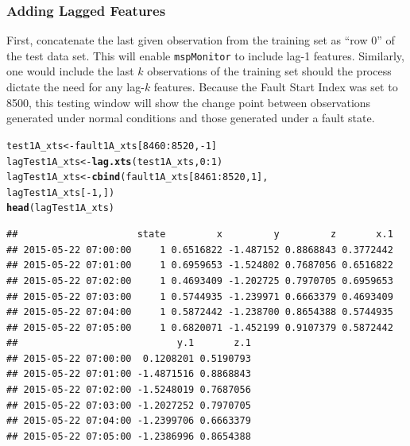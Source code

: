 \documentclass{report}\usepackage[]{graphicx}\usepackage[]{color}
\makeatletter
\newcommand{\hlnum}[1]{\textcolor[rgb]{0.686,0.059,0.569}{#1}}%
\newcommand{\hlopt}[1]{\textcolor[rgb]{0,0,0}{#1}}%
\newcommand{\hlstd}[1]{\textcolor[rgb]{0.345,0.345,0.345}{#1}}%
\newcommand{\hlkwb}[1]{\textcolor[rgb]{0.69,0.353,0.396}{#1}}%
\newcommand{\hlkwd}[1]{\textcolor[rgb]{0.737,0.353,0.396}{\textbf{#1}}}%
\newenvironment{kframe}{%
 \def\at@end@of@kframe{}%
 \ifinner\ifhmode%
  \def\at@end@of@kframe{\end{minipage}}%
  \begin{minipage}{\columnwidth}%
 \fi\fi%
 \def\FrameCommand##1{\hskip\@totalleftmargin \hskip-\fboxsep
 \colorbox{shadecolor}{##1}\hskip-\fboxsep
     \hskip-\linewidth \hskip-\@totalleftmargin \hskip\columnwidth}%
 \MakeFramed {\advance\hsize-\width
   \@totalleftmargin\z@ \linewidth\hsize
   \@setminipage}}%
 {\par\unskip\endMakeFramed%
 \at@end@of@kframe}
\newenvironment{knitrout}{}{} %
\makeatother
\begin{document}
\subsubsection{Adding Lagged Features}
First, concatenate the last given observation from the training set as ``row 0'' of the test data set. This will enable \texttt{mspMonitor} to include lag-1 features. Similarly, one would include the last $k$ observations of the training set should the process dictate the need for any lag-$k$ features. Because the Fault Start Index was set to 8500, this testing window will show the change point between observations generated under normal conditions and those generated under a fault state.
\begin{knitrout}
\color{fgcolor}\begin{kframe}
\begin{alltt}
\hlstd{test1A_xts} \hlkwb{<-} \hlstd{fault1A_xts[}\hlnum{8460}\hlopt{:}\hlnum{8520}\hlstd{,} \hlopt{-}\hlnum{1}\hlstd{]}
\hlstd{lagTest1A_xts} \hlkwb{<-} \hlkwd{lag.xts}\hlstd{(test1A_xts,} \hlnum{0}\hlopt{:}\hlnum{1}\hlstd{)}
\hlstd{lagTest1A_xts} \hlkwb{<-} \hlkwd{cbind}\hlstd{(fault1A_xts[}\hlnum{8461}\hlopt{:}\hlnum{8520}\hlstd{,}\hlnum{1}\hlstd{],}
                       \hlstd{lagTest1A_xts[}\hlopt{-}\hlnum{1}\hlstd{,])}
\hlkwd{head}\hlstd{(lagTest1A_xts)}
\end{alltt}
\begin{verbatim}
##                     state         x         y         z       x.1
## 2015-05-22 07:00:00     1 0.6516822 -1.487152 0.8868843 0.3772442
## 2015-05-22 07:01:00     1 0.6959653 -1.524802 0.7687056 0.6516822
## 2015-05-22 07:02:00     1 0.4693409 -1.202725 0.7970705 0.6959653
## 2015-05-22 07:03:00     1 0.5744935 -1.239971 0.6663379 0.4693409
## 2015-05-22 07:04:00     1 0.5872442 -1.238700 0.8654388 0.5744935
## 2015-05-22 07:05:00     1 0.6820071 -1.452199 0.9107379 0.5872442
##                            y.1       z.1
## 2015-05-22 07:00:00  0.1208201 0.5190793
## 2015-05-22 07:01:00 -1.4871516 0.8868843
## 2015-05-22 07:02:00 -1.5248019 0.7687056
## 2015-05-22 07:03:00 -1.2027252 0.7970705
## 2015-05-22 07:04:00 -1.2399706 0.6663379
## 2015-05-22 07:05:00 -1.2386996 0.8654388
\end{verbatim}
\end{kframe}
\end{knitrout}
\end{document}
